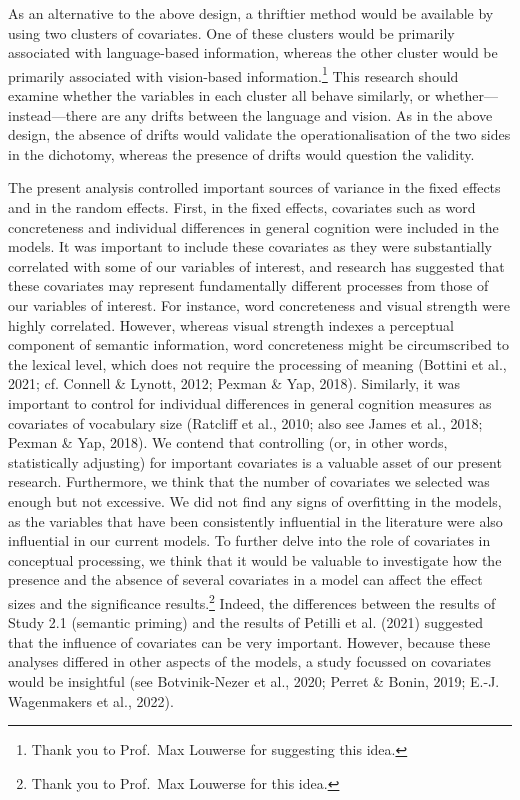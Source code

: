 \documentclass[
  12pt,
  man,floatsintext]{apa7}
\begin{document}
As an alternative to the above design, a thriftier method would be available by using two clusters of covariates. One of these clusters would be primarily associated with language-based information, whereas the other cluster would be primarily associated with vision-based information.\footnote{Thank you to Prof.~Max Louwerse for suggesting this idea.} This research should examine whether the variables in each cluster all behave similarly, or whether---instead---there are any drifts between the language and vision. As in the above design, the absence of drifts would validate the operationalisation of the two sides in the dichotomy, whereas the presence of drifts would question the validity.

The present analysis controlled important sources of variance in the fixed effects and in the random effects. First, in the fixed effects, covariates such as word concreteness and individual differences in general cognition were included in the models. It was important to include these covariates as they were substantially correlated with some of our variables of interest, and research has suggested that these covariates may represent fundamentally different processes from those of our variables of interest. For instance, word concreteness and visual strength were highly correlated. However, whereas visual strength indexes a perceptual component of semantic information, word concreteness might be circumscribed to the lexical level, which does not require the processing of meaning (Bottini et al., 2021; cf. Connell \& Lynott, 2012; Pexman \& Yap, 2018). Similarly, it was important to control for individual differences in general cognition measures as covariates of vocabulary size (Ratcliff et al., 2010; also see James et al., 2018; Pexman \& Yap, 2018). We contend that controlling (or, in other words, statistically adjusting) for important covariates is a valuable asset of our present research. Furthermore, we think that the number of covariates we selected was enough but not excessive. We did not find any signs of overfitting in the models, as the variables that have been consistently influential in the literature were also influential in our current models. To further delve into the role of covariates in conceptual processing, we think that it would be valuable to investigate how the presence and the absence of several covariates in a model can affect the effect sizes and the significance results.\footnote{Thank you to Prof.~Max Louwerse for this idea.} Indeed, the differences between the results of Study 2.1 (semantic priming) and the results of Petilli et al. (2021) suggested that the influence of covariates can be very important. However, because these analyses differed in other aspects of the models, a study focussed on covariates would be insightful (see Botvinik-Nezer et al., 2020; Perret \& Bonin, 2019; E.-J. Wagenmakers et al., 2022).
\end{document}
